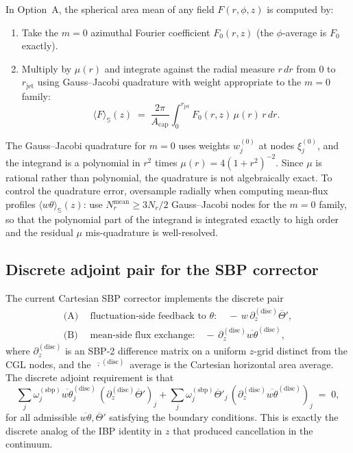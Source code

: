 \documentclass[11pt]{article}
\newcommand{\meanS}[1]{\langle #1 \rangle_{\mathbb{S}}}
\newcommand{\rjet}{r_{\mathrm{jet}}}
\begin{document}
In Option~A, the spherical area mean of any field $F(r, \phi, z)$ is
computed by:
\begin{enumerate}[leftmargin=2em,itemsep=2pt]
  \item Take the $m=0$ azimuthal Fourier coefficient $F_{0}(r, z)$
  (the $\phi$-average is $F_{0}$ exactly).
  \item Multiply by $\mu(r)$ and integrate against the radial measure
  $r\,dr$ from $0$ to $\rjet$ using Gauss--Jacobi quadrature with
  weight appropriate to the $m=0$ family:
  \begin{equation}
    \meanS{F}(z) \;=\; \frac{2\pi}{A_{\mathrm{cap}}}
    \int_{0}^{\rjet} F_{0}(r, z)\,\mu(r)\,r\,dr.
    \label{eq:disc-mean}
  \end{equation}
\end{enumerate}
The Gauss--Jacobi quadrature for $m=0$ uses weights $w_{j}^{(0)}$ at
nodes $\xi_{j}^{(0)}$, and the integrand is a polynomial in $r^{2}$
times $\mu(r) = 4(1+r^{2})^{-2}$.  Since $\mu$ is rational rather
than polynomial, the quadrature is not algebraically exact.  To
control the quadrature error, oversample radially when computing
mean-flux profiles $\meanS{w\theta}(z)$: use
$N_{r}^{\mathrm{mean}} \ge 3 N_{r}/2$ Gauss--Jacobi nodes for the
$m=0$ family, so that the polynomial part of the integrand is
integrated exactly to high order and the residual $\mu$
mis-quadrature is well-resolved.

\subsection{Discrete adjoint pair for the SBP corrector}

The current Cartesian SBP corrector implements the discrete pair
\begin{align}
  \text{(A)}\ \ &\text{fluctuation-side feedback to }\theta:
  \quad -\,w\,\partial_{z}^{(\mathrm{disc})}\overline{\Theta}', \\
  \text{(B)}\ \ &\text{mean-side flux exchange:}
  \quad -\,\partial_{z}^{(\mathrm{disc})}\overline{w\theta}^{(\mathrm{disc})},
\end{align}
where $\partial_{z}^{(\mathrm{disc})}$ is an SBP-2 difference matrix
on a uniform $z$-grid distinct from the CGL nodes, and the
$\overline{\,\cdot\,}^{(\mathrm{disc})}$ average is the Cartesian
horizontal area average.  The discrete adjoint requirement is that
\begin{equation}
  \sum_{j} \omega_{j}^{(\mathrm{sbp})}
  \overline{w\theta}^{(\mathrm{disc})}_{j}\,
  (\partial_{z}^{(\mathrm{disc})}\overline{\Theta}')_{j}
  + \sum_{j} \omega_{j}^{(\mathrm{sbp})}
  \overline{\Theta}'_{j}\,
  (\partial_{z}^{(\mathrm{disc})}\overline{w\theta}^{(\mathrm{disc})})_{j}
  \;=\; 0,
  \label{eq:disc-adjoint}
\end{equation}
for all admissible $\overline{w\theta}, \overline{\Theta}'$
satisfying the boundary conditions.  This is exactly the discrete
analog of the IBP identity in $z$ that produced cancellation in the
continuum.
\end{document}
